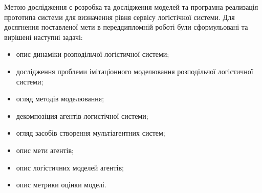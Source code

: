 Метою дослідження є розробка та дослідження моделей та програмна реализація прототипа системи для визначення рівня сервісу логістічної системи.
Для досягнення поставленої мети в переддипломній роботі були сформульовані та вирішені наступні задачі:
\begin{itemize}
	\item опис динаміки розподільчої логістичної системи;
	\item дослідження проблеми імітаціонного моделювання розподільчої логістичної системи;
	\item огляд методів моделювання;
	\item декомпозіция агентів логистічної системи;
	\item огляд засобів створення мультіагентних систем; 
	\item опис мети агентів;
	\item опис логістичних моделей агентів;
	\item опис метрики оцінки моделі.
\end{itemize}
